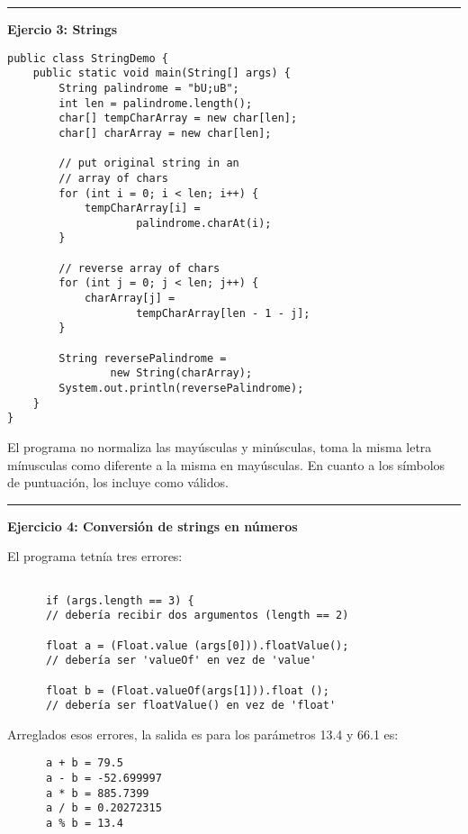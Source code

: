 \documentclass[12pt,letterpaper, onecolumn]{exam}
\begin{document}
\begin{questions}
\noindent\rule{8cm}{0.4pt}
    
        \question[] \textbf{Ejercio 3: Strings}\\
       
    \vspace{-5mm}
    \begin{solution}
           \begin{verbatim}
public class StringDemo {
    public static void main(String[] args) {
        String palindrome = "bU;uB";
        int len = palindrome.length();
        char[] tempCharArray = new char[len];
        char[] charArray = new char[len];

        // put original string in an
        // array of chars
        for (int i = 0; i < len; i++) {
            tempCharArray[i] =
                    palindrome.charAt(i);
        }

        // reverse array of chars
        for (int j = 0; j < len; j++) {
            charArray[j] =
                    tempCharArray[len - 1 - j];
        }

        String reversePalindrome =
                new String(charArray);
        System.out.println(reversePalindrome);
    }
}
      \end{verbatim}
      El programa no normaliza las mayúsculas y minúsculas, toma la misma letra mínusculas como diferente a la misma en mayúsculas. 
      En cuanto a los símbolos de puntuación, los incluye como válidos.
    \end{solution}
\noindent\rule{8cm}{0.4pt}

\question[] \textbf{Ejercicio 4: Conversión de strings en números}\droppoints
  
    \begin{solution}
      El programa tetnía tres errores:
      \begin{verbatim}

      if (args.length == 3) {
      // debería recibir dos argumentos (length == 2) 

      float a = (Float.value (args[0])).floatValue();
      // debería ser 'valueOf' en vez de 'value'

      float b = (Float.valueOf(args[1])).float (); 
      // debería ser floatValue() en vez de 'float'
      \end{verbatim}

      Arreglados esos errores, la salida es para los parámetros 13.4 y 66.1 es:
      \begin{verbatim}
      a + b = 79.5
      a - b = -52.699997
      a * b = 885.7399
      a / b = 0.20272315
      a % b = 13.4
      \end{verbatim}


\end{solution}
\end{questions}
\end{document}
